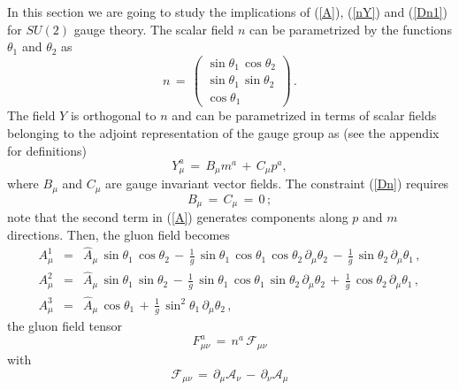 \documentclass[a4paper,a4paper]{article}
\begin{document}
In this section we are going to study the implications of
(\ref{A}), (\ref{nY}) and (\ref{Dn1}) for
$SU(2)$ gauge theory. The scalar field $n$ can be
parametrized by the functions $\theta_1$ and $\theta_2$ as
\begin{equation}
   n \, = \, \left( \begin{array}{c}
                     \sin \theta_1 \, \cos \theta_2  \\
                     \sin \theta_1 \, \sin \theta_2  \\
                     \cos \theta_1
                    \end{array}
             \right) \, .
   \label{nn}
\end{equation}
The field $Y$ is orthogonal to $n$ and can be parametrized in terms of scalar
fields belonging to the adjoint representation of the gauge group as 
(see the appendix for definitions)
\begin{equation}
  Y^a_\mu \, = \, B_\mu m^a \, + \, C_\mu p^a,
\end{equation}
where $B_\mu$ and $C_\mu$ are gauge invariant vector fields. The constraint
(\ref{Dn}) requires
\begin{equation}
 B_\mu \, = \, C_\mu \, = \, 0 \, ;
\end{equation}
note that the second term in (\ref{A}) generates components along $p$ and 
$m$ directions. Then, the gluon field becomes
\begin{eqnarray}
  A^1_\mu & = &
     \hat{A}_\mu \, \sin \theta_1 \, \cos \theta_2 \, - \,
           \frac{1}{g} \, \sin \theta_1 \, \cos \theta_1 \, \cos \theta_2
                          \, \partial_\mu \theta_2 \, - \,
            \frac{1}{g} \, \sin \theta_2 \, \partial_\mu \theta_1 \, , 
  \nonumber \\
  A^2_\mu & = &
      \hat{A}_\mu \, \sin \theta_1 \, \sin \theta_2 \, - \,
            \frac{1}{g} \, \sin \theta_1 \, \cos \theta_1 \, \sin \theta_2
                        \, \partial_\mu \theta_2 \, + \,
            \frac{1}{g} \, \cos \theta_2 \, \partial_\mu \theta_1 \, , 
  \nonumber \\
  A^3_\mu & = &
      \hat{A}_\mu \, \cos \theta_1 \, + \,
      \frac{1}{g} \, \sin^2 \theta_1
                  \, \partial_\mu \theta_2 \, ,
\end{eqnarray}
the gluon field tensor
\begin{equation}
   F^a_{\mu\nu} \, = \, n^a \, \mathcal{F}_{\mu\nu}
\end{equation}
with
\begin{equation}
 \mathcal{F}_{\mu\nu} \, = \, \partial_\mu \mathcal{A}_\nu \, - \, 
                              \partial_\nu \mathcal{A}_\mu
\end{equation}
\end{document}
